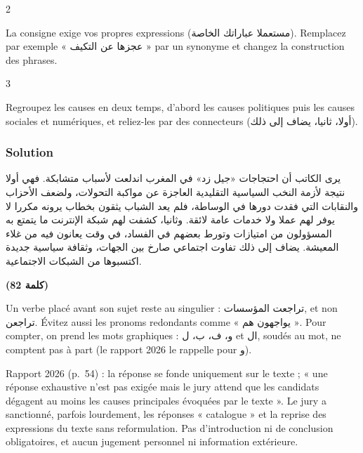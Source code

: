\documentclass[11pt,a4paper]{article}
\begin{document}
\begin{indication}{2}

La consigne exige vos propres expressions (مستعملا عباراتك الخاصة). Remplacez par exemple « عجزها عن التكيف » par un synonyme et changez la construction des phrases.

\end{indication}

\begin{indication}{3}

Regroupez les causes en deux temps, d'abord les causes politiques puis les causes sociales et numériques, et reliez-les par des connecteurs (أولا، ثانيا، يضاف إلى ذلك).

\end{indication}

\hypertarget{solution-6}{%
\subsubsection{Solution}\label{solution-6}}

يرى الكاتب أن احتجاجات «جيل زد» في المغرب اندلعت لأسباب متشابكة. فهي أولا نتيجة لأزمة النخب السياسية التقليدية العاجزة عن مواكبة التحولات، ولضعف الأحزاب والنقابات التي فقدت دورها في الوساطة، فلم يعد الشباب يثقون بخطاب يرونه مكررا لا يوفر لهم عملا ولا خدمات عامة لائقة. وثانيا، كشفت لهم شبكة الإنترنت ما يتمتع به المسؤولون من امتيازات وتورط بعضهم في الفساد، في وقت يعانون فيه من غلاء المعيشة. يضاف إلى ذلك تفاوت اجتماعي صارخ بين الجهات، وثقافة سياسية جديدة اكتسبوها من الشبكات الاجتماعية.

\textbf{(82 كلمة)}

\begin{piege}

Un verbe placé avant son sujet reste au singulier : تراجعت المؤسسات, et non تراجعن. Évitez aussi les pronoms redondants comme « يواجهون هم ». Pour compter, on prend les mots graphiques : و، ف، ب، ل et ال, soudés au mot, ne comptent pas à part (le rapport 2026 le rappelle pour و).

\end{piege}

\begin{jury}

Rapport 2026 (p.~54) : la réponse se fonde uniquement sur le texte ; « une réponse exhaustive n'est pas exigée mais le jury attend que les candidats dégagent au moins les causes principales évoquées par le texte ». Le jury a sanctionné, parfois lourdement, les réponses « catalogue » et la reprise des expressions du texte sans reformulation. Pas d'introduction ni de conclusion obligatoires, et aucun jugement personnel ni information extérieure.

\end{jury}
\end{document}
